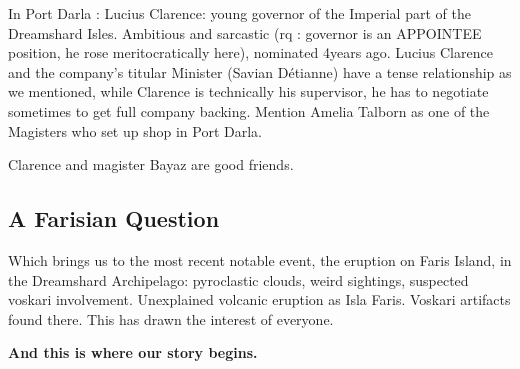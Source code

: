In Port Darla : Lucius Clarence: young governor of the Imperial part of the Dreamshard Isles. Ambitious and sarcastic (rq : governor is an APPOINTEE position, he rose meritocratically here), nominated 4years ago. Lucius Clarence and the company's titular Minister (Savian Détianne) have a tense relationship as we mentioned, while Clarence is technically his supervisor, he has to negotiate sometimes to get full company backing. Mention Amelia Talborn as one of the Magisters who set up shop in Port Darla.

Clarence and magister Bayaz are good friends.


\subsection{A Farisian Question}

Which brings us to the most recent notable event, the eruption on Faris Island, in the Dreamshard Archipelago: pyroclastic clouds, weird sightings, suspected voskari involvement. Unexplained volcanic eruption as Isla Faris. Voskari artifacts found there. This has drawn the interest of everyone.

\vspace{1cm}

\textbf{And this is where our story begins.}